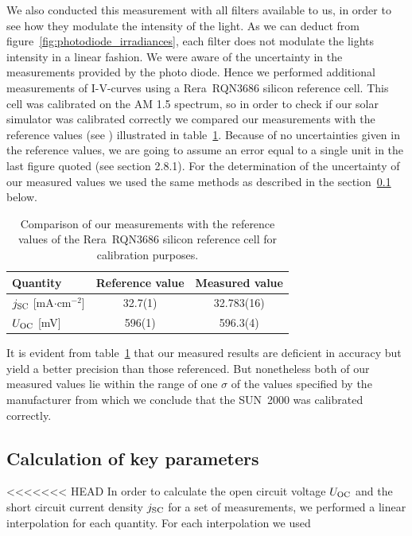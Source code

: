 We also conducted this measurement with all filters available to us, in order to see how they modulate the intensity of the light. As we can deduct from figure~\ref{fig:photodiode_irradiances}, each filter does not modulate the lights intensity in a linear fashion.\mypar
We were aware of the uncertainty in the measurements provided by the photo diode. Hence we performed additional measurements of I-V-curves using a Rera~RQN3686 silicon reference cell. This cell was calibrated on the AM 1.5 spectrum, so in order to check if our solar simulator was calibrated correctly we compared our measurements with the reference values (see \cite{reracat}) illustrated in table~\ref{tab:reracomp}. Because of no uncertainties given in the reference values, we are going to assume an error equal to a single unit in the last figure quoted (see \cite{measurements} section 2.8.1). For the determination of the uncertainty of our measured values we used the same methods as described in the section~\ref{subsec:calckeyparams} below.
\begin{table}[h]\centering
\caption{Comparison of our measurements with the reference values of the Rera~RQN3686 silicon reference cell for calibration purposes.}
\label{tab:reracomp}
\begin{tabular}{@{}lcc@{}}\toprule
Quantity & Reference value & Measured value\\ \midrule
$j_{\text{SC}}$ [mA$\cdot$cm$^{-2}$] & 32.7(1) & 32.783(16) \\
$U_{\text{OC}}$ [mV]& 596(1) & 596.3(4) \\ \bottomrule
\end{tabular}
\end{table}

It is evident from table~\ref{tab:reracomp} that our measured results are deficient in accuracy but yield a better precision than those referenced. But nonetheless both of our measured values lie within the range of one $\sigma$ of the values specified by the manufacturer from which we conclude that the SUN~2000 was calibrated correctly.


\subsection{Calculation of key parameters}\label{subsec:calckeyparams}
<<<<<<< HEAD
In order to calculate the open circuit voltage $U_{\text{OC}}$ and the short circuit current density $j_{\text{SC}}$ for a set of measurements, we performed a linear interpolation for each quantity. For each interpolation we used

